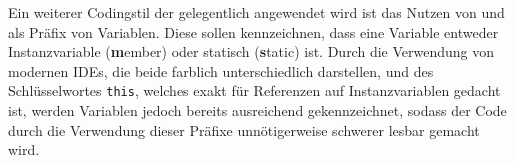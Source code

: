 Ein weiterer Codingstil der gelegentlich angewendet wird ist das Nutzen von  und  als Präfix von Variablen. Diese sollen kennzeichnen, dass eine Variable entweder Instanzvariable (\textbf{m}ember) oder statisch (\textbf{s}tatic) ist. Durch die Verwendung von modernen IDEs, die beide farblich unterschiedlich darstellen, und des Schlüsselwortes \texttt{this}, welches exakt für Referenzen auf Instanzvariablen gedacht ist, werden Variablen jedoch bereits ausreichend gekennzeichnet, sodass der Code durch die Verwendung dieser Präfixe unnötigerweise schwerer lesbar gemacht wird.